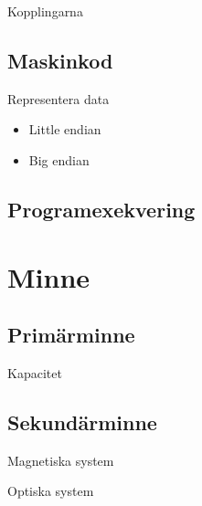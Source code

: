 \documentclass{beamer}
\theoremstyle{definition}
\theoremstyle{remark}
\begin{document}
\begin{frame}{\insertsubsectionhead}{Kopplingarna}
\end{frame}

\subsection{Maskinkod}

\begin{frame}{\insertsubsectionhead}
\end{frame}

\begin{frame}{\insertsubsectionhead}{Representera data}
  \begin{itemize}
    \item Little endian
    \item Big endian
  \end{itemize}
\end{frame}

\subsection{Programexekvering}

\begin{frame}{\insertsubsectionhead}
\end{frame}


\section{Minne}

\subsection{Primärminne}

\begin{frame}{\insertsubsectionhead}{Kapacitet}
\end{frame}

\subsection{Sekundärminne}

\begin{frame}{\insertsubsectionhead}{Magnetiska system}
\end{frame}

\begin{frame}{\insertsubsectionhead}{Optiska system}
\end{frame}
\end{document}
